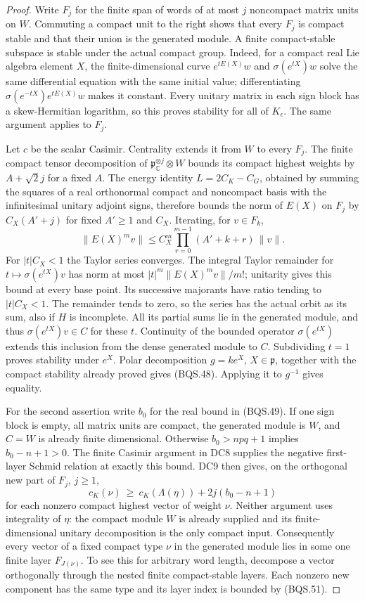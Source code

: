 \begin{proof}
Write $F_j$ for the finite span of words of at most $j$ noncompact
matrix units on $W$.  Commuting a compact unit to the right shows
that every $F_j$ is compact stable and that their union is the
generated module.  A finite compact-stable subspace is stable under
the actual compact group.  Indeed, for a compact real Lie algebra
element $X$, the finite-dimensional curve $e^{tE(X)}w$ and
$\sigma(e^{tX})w$ solve the same differential equation with the
same initial value; differentiating
$\sigma(e^{-tX})e^{tE(X)}w$ makes it constant.
Every unitary matrix in each sign block has a skew-Hermitian logarithm,
so this proves stability for all of $K_\epsilon$.
The same argument applies to $F_j$.

Let $c$ be the scalar Casimir.  Centrality extends it from $W$
to every $F_j$.  The finite compact tensor decomposition of
$\mathfrak p_{\mathbb C}^{\otimes j}\otimes W$ bounds its compact
highest weights by $A+\sqrt2j$ for a fixed $A$.
The energy identity
$L=2C_K-C_G$, obtained by summing the squares of a real orthonormal
compact and noncompact basis with the infinitesimal unitary adjoint
signs, therefore bounds the norm of $E(X)$ on $F_j$ by
$C_X(A'+j)$ for fixed $A'\ge1$ and $C_X$.
Iterating, for $v\in F_k$,
\[
 \|E(X)^m v\|
 \le C_X^m\prod_{r=0}^{m-1}(A'+k+r)\,\|v\|.
 \tag{BQS.50}
\]
For $|t|C_X<1$ the Taylor series converges.
The integral Taylor remainder for
$t\mapsto\sigma(e^{tX})v$ has norm at most
$|t|^m\|E(X)^m v\|/m!$; unitarity gives this bound at every
base point.  Its successive majorants have ratio tending to
$|t|C_X<1$.  The remainder tends to zero, so the series has
the actual orbit as its sum, also if $H$ is incomplete.
All its partial sums lie in the generated module, and thus
$\sigma(e^{tX})v\in C$ for these $t$.
Continuity of the bounded operator $\sigma(e^{tX})$ extends
this inclusion from the dense generated module to $C$.
Subdividing $t=1$ proves stability under $e^X$.
Polar decomposition $g=k e^X$, $X\in\mathfrak p$, together with
the compact stability already proved gives (BQS.48).
Applying it to $g^{-1}$ gives equality.

For the second assertion write $b_0$ for the real bound in
(BQS.49).  If one sign block is empty, all matrix units are compact,
the generated module is $W$, and $C=W$ is already finite dimensional.
Otherwise $b_0>npq+1$ implies $b_0-n+1>0$.
The finite Casimir argument in DC8 supplies the negative first-layer
Schmid relation at exactly this bound.  DC9 then gives, on the
orthogonal new part of $F_j$, $j\ge1$,
\[
 c_K(\nu)\ \ge\ c_K(\Lambda(\eta))
                         +2j(b_0-n+1)
 \tag{BQS.51}
\]
for each nonzero compact highest vector of weight $\nu$.
Neither argument uses integrality of $\eta$: the compact module
$W$ is already supplied and its finite-dimensional unitary
decomposition is the only compact input.
Consequently every vector of a fixed compact type $\nu$ in the
generated module lies in some one finite layer $F_{J(\nu)}$.
To see this for arbitrary word length, decompose a vector
orthogonally through the nested finite compact-stable layers.
Each nonzero new component has the same type and its layer index
is bounded by (BQS.51).


\end{proof}
